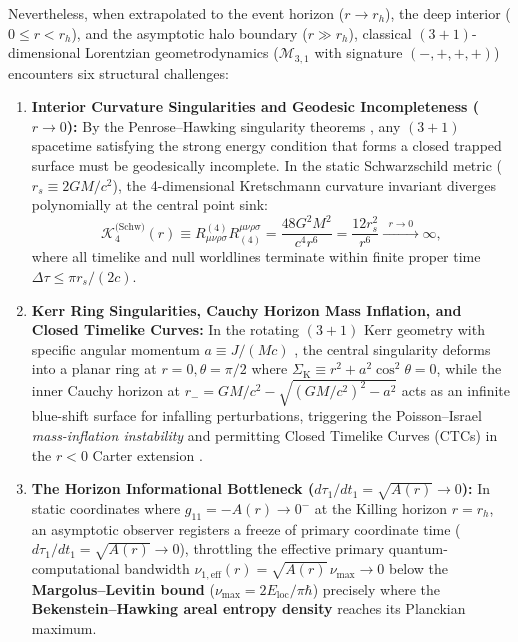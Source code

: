 \documentclass[11pt,a4paper]{article}
\theoremstyle{plain}
\theoremstyle{definition}
\theoremstyle{remark}
\numberwithin{equation}{section}
\begin{document}
Nevertheless, when extrapolated to the event horizon ($r \to r_h$), the deep interior ($0 \le r < r_h$), and the asymptotic halo boundary ($r \gg r_h$), classical $(3+1)$-dimensional Lorentzian geometrodynamics ($\mathcal{M}_{3,1}$ with signature $(-,+,+,+)$) encounters six structural challenges:
\begin{enumerate}
    \item \textbf{Interior Curvature Singularities and Geodesic Incompleteness ($r \to 0$):} By the Penrose--Hawking singularity theorems \cite{penrose1965,hawking1970}, any $(3+1)$ spacetime satisfying the strong energy condition that forms a closed trapped surface must be geodesically incomplete. In the static Schwarzschild metric ($r_s \equiv 2GM/c^2$), the 4-dimensional Kretschmann curvature invariant diverges polynomially at the central point sink:
    \begin{equation}
    \mathcal{K}_4^{\text{(Schw)}}(r) \equiv R_{\mu\nu\rho\sigma}^{(4)} R^{\mu\nu\rho\sigma}_{(4)} = \frac{48 G^2 M^2}{c^4 r^6} = \frac{12 r_s^2}{r^6} \xrightarrow{\;\; r \to 0 \;\;} \infty,
    \label{eq:classical_kretschmann_div}
    \end{equation}
    where all timelike and null worldlines terminate within finite proper time $\Delta\tau \le \pi r_s / (2c)$.

    \item \textbf{Kerr Ring Singularities, Cauchy Horizon Mass Inflation, and Closed Timelike Curves:} In the rotating $(3+1)$ Kerr geometry with specific angular momentum $a \equiv J/(Mc)$ \cite{kerr1963,boyer1967}, the central singularity deforms into a planar ring at $r = 0, \theta = \pi/2$ where $\Sigma_{\text{K}} \equiv r^2 + a^2\cos^2\theta = 0$, while the inner Cauchy horizon at $r_- = GM/c^2 - \sqrt{(GM/c^2)^2 - a^2}$ acts as an infinite blue-shift surface for infalling perturbations, triggering the Poisson--Israel \textit{mass-inflation instability} \cite{poisson1990,ori1991} and permitting Closed Timelike Curves (CTCs) in the $r < 0$ Carter extension \cite{carter1968}.

    \item \textbf{The Horizon Informational Bottleneck ($d\tau_1/dt_1 = \sqrt{A(r)} \to 0$):} In static coordinates where $g_{11} = -A(r) \to 0^-$ at the Killing horizon $r = r_h$, an asymptotic observer registers a freeze of primary coordinate time ($d\tau_1 / dt_1 = \sqrt{A(r)} \to 0$), throttling the effective primary quantum-computational bandwidth $\nu_{1,\text{eff}}(r) = \sqrt{A(r)}\,\nu_{\max} \to 0$ below the \textbf{Margolus--Levitin bound} ($\nu_{\max} = 2E_{\text{loc}}/\pi\hbar$) \cite{margolus1998,lloyd2000} precisely where the \textbf{Bekenstein--Hawking areal entropy density} \cite{bekenstein1973,bekenstein1981} reaches its Planckian maximum.


\end{enumerate}
\end{document}
